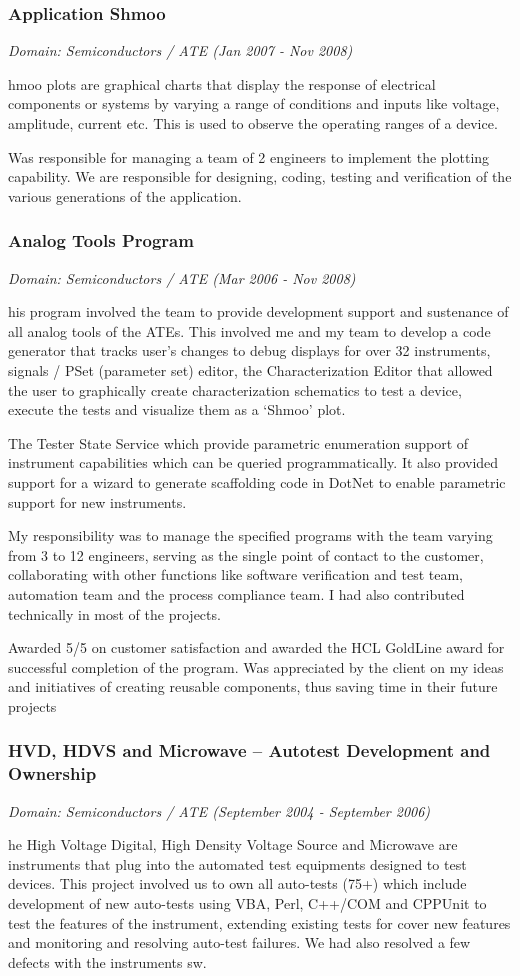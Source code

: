 \documentclass[a4paper,12pt]{article}
\newcommand\cvprojectentry[5]{
  \subsubsection*{#1}
  
  \vspace{-7pt}
  
  \it{Domain: #2}\normalfont{} \quad (#3 - #4)
  
}
\begin{document}
\cvprojectentry{Application Shmoo}{Semiconductors / ATE}{Jan 2007}{Nov 2008}

Shmoo plots are graphical charts that display the response of
electrical components or systems by varying a range of conditions and
inputs like voltage, amplitude, current etc. This is used to observe
the operating ranges of a device.
 
Was responsible for managing a team of 2 engineers to implement the
plotting capability. We are responsible for designing, coding, testing
and verification of the various generations of the application.
 
\cvprojectentry{Analog Tools Program}{Semiconductors / ATE}{Mar 2006}{Nov 2008}

This program involved the team to provide development support and
sustenance of all analog tools of the ATEs. This involved me and my
team to develop a code generator that tracks user's changes to debug
displays for over 32 instruments, signals / PSet (parameter set)
editor, the Characterization Editor that allowed the user to
graphically create characterization schematics to test a device,
execute the tests and visualize them as a `Shmoo' plot.

The Tester State Service which provide parametric enumeration support
of instrument capabilities which can be queried programmatically. It
also provided support for a wizard to generate scaffolding code in
DotNet to enable parametric support for new instruments.
 
My responsibility was to manage the specified programs with the team
varying from 3 to 12 engineers, serving as the single point of contact
to the customer, collaborating with other functions like software
verification and test team, automation team and the process compliance
team. I had also contributed technically in most of the projects.
 
Awarded 5/5 on customer satisfaction and awarded the HCL GoldLine
award for successful completion of the program. Was appreciated by the
client on my ideas and initiatives of creating reusable components,
thus saving time in their future projects
 
\cvprojectentry{HVD, HDVS and Microwave – Autotest Development and
  Ownership}{Semiconductors / ATE}{September 2004}{September 2006}

The High Voltage Digital, High Density Voltage Source and Microwave
are instruments that plug into the automated test equipments designed
to test devices. This project involved us to own all auto-tests (75+)
which include development of new auto-tests using VBA, Perl, C++/COM
and CPPUnit to test the features of the instrument, extending existing
tests for cover new features and monitoring and resolving auto-test
failures. We had also resolved a few defects with the instruments sw.
 
\end{document}
